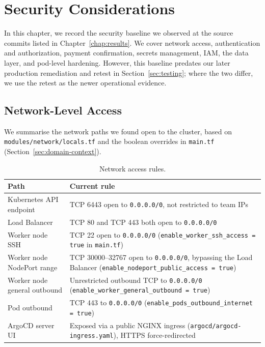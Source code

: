 \chapter{Security Considerations}\label{chap:security}

In this chapter, we record the security baseline we observed at the source commits
listed in Chapter~\ref{chap:results}. We cover network access, authentication and
authorization, payment confirmation, secrets management, IAM, the data layer, and
pod-level hardening. However, this baseline predates our later production
remediation and retest in Section~\ref{sec:testing}; where the two differ, we use
the retest as the newer operational evidence.

\section{Network-Level Access}\label{sec:sec-network}
We summarise the network paths we found open to the
cluster, based on \texttt{modules/\allowbreak network/\allowbreak locals.tf} and the boolean overrides in
\texttt{main.tf} (Section~\ref{sec:domain-context}).

\begin{table}[H]
\centering
\caption{Network access rules.}
\label{tab:security-network}
\small
\begin{tabularx}{\textwidth}{>{\raggedright\arraybackslash}p{3.4cm} X}
\toprule
\textbf{Path} & \textbf{Current rule} \\
\midrule
Kubernetes API endpoint & TCP 6443 open to \texttt{0.0.0.0/0}, not restricted to team IPs \\
Load Balancer & TCP 80 and TCP 443 both open to \texttt{0.0.0.0/0} \\
Worker node SSH & TCP 22 open to \texttt{0.0.0.0/0} (\texttt{enable\_worker\_ssh\_access = true} in \texttt{main.tf}) \\
Worker node NodePort range & TCP 30000--32767 open to \texttt{0.0.0.0/0}, bypassing the Load Balancer (\texttt{enable\_nodeport\_public\_access = true}) \\
Worker node general outbound & Unrestricted outbound TCP to \texttt{0.0.0.0/0} (\texttt{enable\_worker\_\allowbreak general\_\allowbreak outbound = true}) \\
Pod outbound & TCP 443 to \texttt{0.0.0.0/0} (\texttt{enable\_pods\_outbound\_internet = true}) \\
ArgoCD server UI & Exposed via a public NGINX ingress (\texttt{argocd/argocd-ingress.yaml}), HTTPS force-redirected \\
\bottomrule
\end{tabularx}
\end{table}

